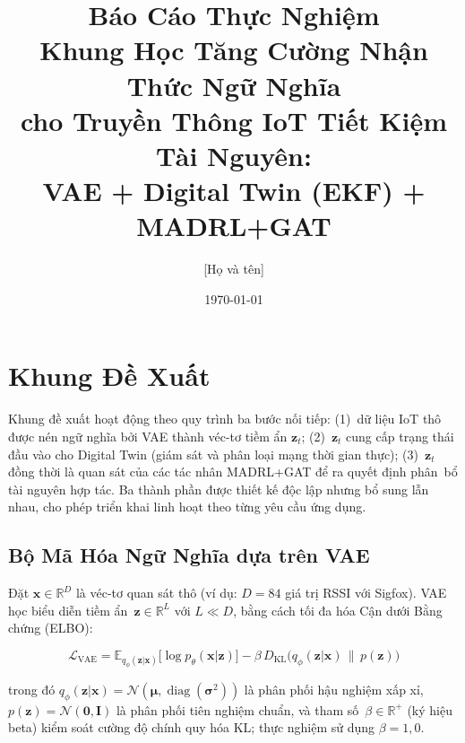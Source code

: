 \documentclass[12pt, a4paper]{article}
\title{
  \textbf{Báo Cáo Thực Nghiệm}\\[0.5em]
  \large Khung Học Tăng Cường Nhận Thức Ngữ Nghĩa\\
  cho Truyền Thông IoT Tiết Kiệm Tài Nguyên:\\
  VAE + Digital Twin (EKF) + MADRL+GAT
}
\author{[Họ và tên] \\ [Tên trường / Khoa / Bộ môn]}
\date{\today}
\begin{document}
\maketitle
\tableofcontents
\newpage

\section{Khung Đề Xuất}
\label{sec:framework}

Khung đề xuất hoạt động theo quy trình ba bước nối tiếp:
(1)~dữ liệu IoT thô được nén ngữ nghĩa bởi VAE thành véc-tơ
tiềm ẩn $\mathbf{z}_t$;
(2)~$\mathbf{z}_t$ cung cấp trạng thái đầu vào cho Digital Twin
(giám sát và phân loại mạng thời gian thực);
(3)~$\mathbf{z}_t$ đồng thời là quan sát của các tác nhân MADRL+GAT
để ra quyết định \mbox{phân bổ} tài nguyên hợp tác.
Ba thành phần được thiết kế độc lập nhưng bổ sung lẫn nhau,
cho phép triển khai linh hoạt theo từng yêu cầu ứng dụng.


\subsection{Bộ Mã Hóa Ngữ Nghĩa dựa trên VAE}
\label{subsec:vae}

Đặt $\mathbf{x} \in \mathbb{R}^D$ là véc-tơ quan sát thô
(ví dụ: $D = 84$ giá trị RSSI với Sigfox).
VAE học biểu diễn tiềm ẩn~$\mathbf{z} \in \mathbb{R}^L$
với $L \ll D$, bằng cách tối đa hóa Cận dưới Bằng chứng (ELBO):

\begin{equation}
  \mathcal{L}_{\text{VAE}}
  = \mathbb{E}_{q_\phi(\mathbf{z}|\mathbf{x})}
    \bigl[\log p_\theta(\mathbf{x}|\mathbf{z})\bigr]
  - \beta\, D_{\text{KL}}\!\bigl(q_\phi(\mathbf{z}|\mathbf{x})
    \,\|\, p(\mathbf{z})\bigr)
  \label{eq:vae}
\end{equation}

trong đó $q_\phi(\mathbf{z}|\mathbf{x}) = \mathcal{N}(\boldsymbol{\mu},
\operatorname{diag}(\boldsymbol{\sigma}^2))$ là phân phối hậu nghiệm
xấp xỉ, $p(\mathbf{z}) = \mathcal{N}(\mathbf{0}, \mathbf{I})$
là phân phối tiên nghiệm chuẩn, và tham số~$\beta \in \mathbb{R}^{+}$
(ký hiệu beta) kiểm soát cường độ chính quy hóa KL;
thực nghiệm sử dụng $\beta = 1{,}0$.
\end{document}
